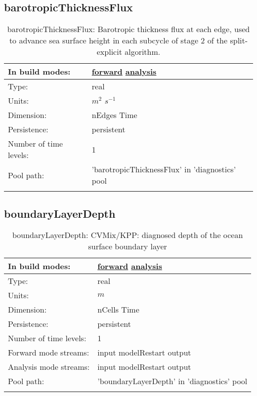 \subsection[barotropicThicknessFlux]{barotropicThicknessFlux}
\label{subsec:var_sec_diagnostics_barotropicThicknessFlux}
\begin{center}
\begin{longtable}{| p{2.0in} | p{4.0in} |}
        \hline 
        In build modes: & \hyperref[subsec:forward_var_tab_diagnostics]{forward} \hyperref[subsec:analysis_var_tab_diagnostics]{analysis} \\
        \hline 
        Type: & real \\
        \hline 
        Units: & $m^2$ $s^{-1}$ \\
        \hline 
        Dimension: & nEdges Time \\
        \hline 
        Persistence: & persistent \\
        \hline 
        Number of time levels: & 1 \\
        \hline 
            Pool path: & 'barotropicThicknessFlux' in 'diagnostics' pool
 \\
		 \hline 
    \caption{barotropicThicknessFlux: Barotropic thickness flux at each edge, used to advance sea surface height in each subcycle of stage 2 of the split-explicit algorithm.}
\end{longtable}
\end{center}
\subsection[boundaryLayerDepth]{boundaryLayerDepth}
\label{subsec:var_sec_diagnostics_boundaryLayerDepth}
\begin{center}
\begin{longtable}{| p{2.0in} | p{4.0in} |}
        \hline 
        In build modes: & \hyperref[subsec:forward_var_tab_diagnostics]{forward} \hyperref[subsec:analysis_var_tab_diagnostics]{analysis} \\
        \hline 
        Type: & real \\
        \hline 
        Units: & $m$ \\
        \hline 
        Dimension: & nCells Time \\
        \hline 
        Persistence: & persistent \\
        \hline 
        Number of time levels: & 1 \\
        \hline 
		 Forward mode streams: &  input modelRestart output \\
        \hline 
		 Analysis mode streams: &  input modelRestart output \\
        \hline 
            Pool path: & 'boundaryLayerDepth' in 'diagnostics' pool
 \\
		 \hline 
    \caption{boundaryLayerDepth: CVMix/KPP: diagnosed depth of the ocean surface boundary layer}
\end{longtable}
\end{center}
